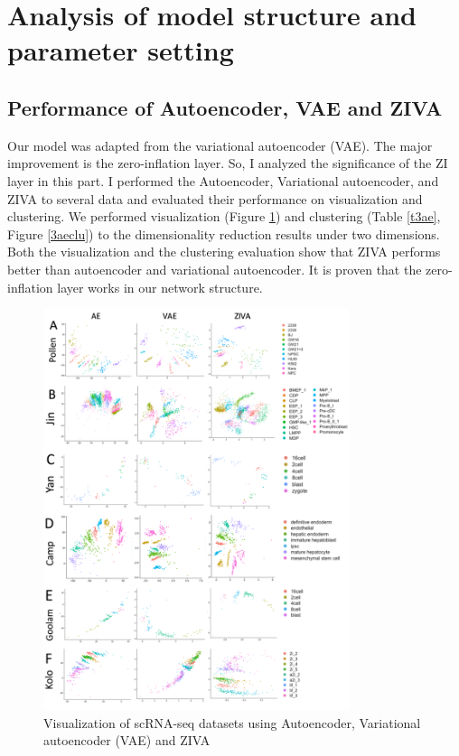 \section{Analysis of model structure and parameter setting}
\subsection{Performance of Autoencoder, VAE and ZIVA}
Our model was adapted from the variational autoencoder (VAE). The major improvement is the zero-inflation layer. So, I analyzed the significance of the ZI layer in this part. I performed the Autoencoder, Variational autoencoder, and ZIVA to several data and evaluated their performance on visualization and clustering. We performed visualization (Figure \ref{3ae}) and clustering (Table \ref{t3ae}, Figure \ref{3aeclu}) to the dimensionality reduction results under two dimensions. Both the visualization and the clustering evaluation show that ZIVA performs better than autoencoder and variational autoencoder. It is proven that the zero-inflation layer works in our network structure. \\
\begin{figure}[htb!]
    \centering
    \includegraphics[width=0.8\textwidth]{figures/myfigures/3ae.png}
    \caption{Visualization of scRNA-seq datasets using Autoencoder, Variational autoencoder (VAE) and ZIVA}
    \label{3ae}
\end{figure}

